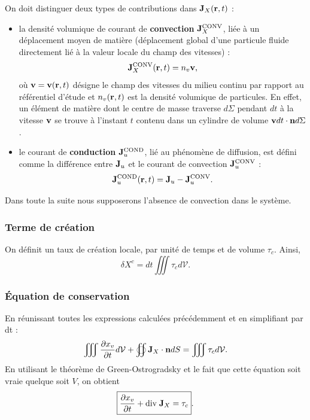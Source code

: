 \documentclass[11pt,a4paper]{report}
\begin{document}
\newpage
On doit distinguer deux types de contributions dans $\bold{J}_X(\bold{r},t)$ :
\begin{itemize}
	\item la densité volumique de courant de \textbf{convection} $\bold{J}_X^{\text{CONV}}$, liée à 	un déplacement moyen de matière (déplacement global d'une particule fluide directement lié à la 	valeur locale du champ des vitesses) : 
	\begin{equation}
		\bold{J}_X^{\text{CONV}}(\bold{r},t) = n_v \bold{v},
	\end{equation}
	où $\bold{v} = \bold{v}(\bold{r},t)$ désigne le champ des vitesses du milieu continu par 			rapport au référentiel d'étude et $n_v(\bold{r},t)$ est la densité volumique de particules.
	En effet, un élément de matière dont le centre de masse traverse $d\Sigma$ pendant $dt$ à la 		vitesse $\bold{v}$ se trouve à l'instant $t$ contenu dans un cylindre de volume $\bold{v}dt			\cdot\bold{n}d\Sigma$.\\

	\item le courant de \textbf{conduction} $\bold{J}_u^{\text{COND}}$, lié au phénomène de 			diffusion, est défini comme la différence entre $\bold{J}_u$ et le courant de convection 
	$\bold{J}_u^{\text{CONV}}$ :
	\begin{equation}
		\bold{J}_u^{\text{COND}}(\bold{r},t) = \bold{J}_u - \bold{J}_u^{\text{CONV}}.
	\end{equation}
\end{itemize}
Dans toute la suite nous supposerons l'absence de convection dans le système.\\

\subsubsection{Terme de création}
On définit un taux de création locale, par unité de temps et de volume $\tau_c$. Ainsi,
\begin{equation}
	\boxed{\delta X^c = dt \iiint \tau_c d\mathcal{V}}.
\end{equation}

\subsubsection{Équation de conservation}
En réunissant toutes les expressions calculées précédemment et en simplifiant par dt :
\begin{equation}
	\iiint \frac{\partial x_v}{\partial t} d\mathcal{V} + \oiint \bold{J}_X\cdot\bold{n}dS
	= \iiint \tau_c d\mathcal{V}.
\end{equation}
En utilisant le théorème de Green-Ostrogradsky et le fait que cette équation soit vraie quelque soit $V$, on obtient
\begin{equation}
	\boxed{\frac{\partial x_v}{\partial t} + \text{div}\;\bold{J}_X = \tau_c}.
\end{equation}
\end{document}
